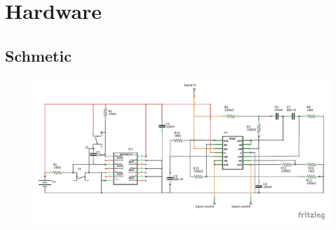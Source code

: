 \section{Hardware}

\subsection{Schmetic}
\begin{figure}[H]
	\includegraphics[trim = 0 30 0 0, clip=true, width = \textwidth]{billeder/Konditionering_schem.pdf}
	\caption{}\label{fig:schematics}
\end{figure}

